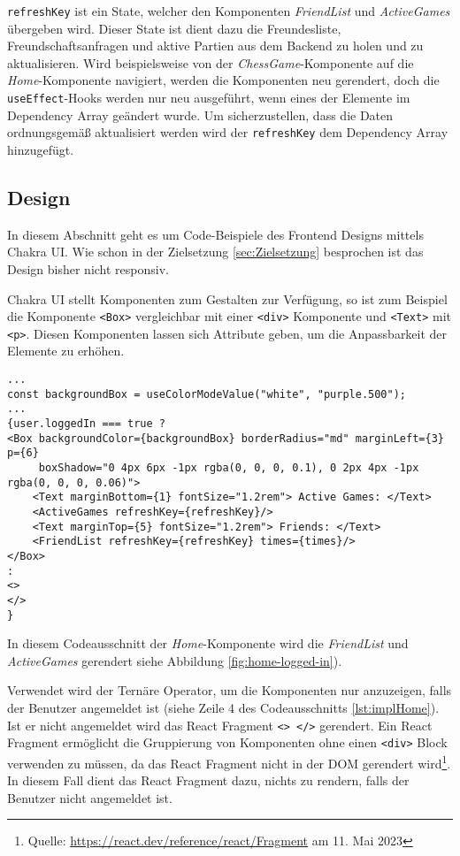 \verb|refreshKey| ist ein State, welcher den Komponenten \textit{FriendList} und \textit{ActiveGames} übergeben wird. Dieser State ist dient dazu die Freundesliste, Freundschaftsanfragen und aktive Partien aus dem Backend zu holen und zu aktualisieren. Wird beispielsweise von der \textit{ChessGame}-Komponente auf die \textit{Home}-Komponente navigiert, werden die Komponenten neu gerendert, doch die \verb|useEffect|-Hooks werden nur neu ausgeführt, wenn eines der Elemente im Dependency Array geändert wurde. Um sicherzustellen, dass die Daten ordnungsgemäß aktualisiert werden wird der \verb|refreshKey| dem Dependency Array hinzugefügt.


\subsection{Design}
\label{sec:Design}
In diesem Abschnitt geht es um Code-Beispiele des Frontend Designs mittels Chakra UI.  Wie schon in der Zielsetzung \ref{sec:Zielsetzung} besprochen ist das Design bisher nicht responsiv.

Chakra UI stellt Komponenten zum Gestalten zur Verfügung, so ist zum Beispiel die Komponente \verb|<Box>| vergleichbar mit einer \verb|<div>| Komponente und \verb|<Text>| mit \verb|<p>|. Diesen Komponenten lassen sich Attribute geben, um die Anpassbarkeit der Elemente zu erhöhen.

\begin{lstlisting}[style=codeStyle, caption={Darstellung der \textit{Friendlist} und \textit{ActiveGames} Komponenten in der \textit{Home}-Komponente}, label={lst:impl-Home}]
...
const backgroundBox = useColorModeValue("white", "purple.500");
...
{user.loggedIn === true ?
<Box backgroundColor={backgroundBox} borderRadius="md" marginLeft={3} p={6}
     boxShadow="0 4px 6px -1px rgba(0, 0, 0, 0.1), 0 2px 4px -1px rgba(0, 0, 0, 0.06)">
    <Text marginBottom={1} fontSize="1.2rem"> Active Games: </Text>
    <ActiveGames refreshKey={refreshKey}/>
    <Text marginTop={5} fontSize="1.2rem"> Friends: </Text>
    <FriendList refreshKey={refreshKey} times={times}/>
</Box>
:
<>
</>
}
\end{lstlisting}

In diesem Codeausschnitt der \textit{Home}-Komponente wird die \textit{FriendList} und \textit{ActiveGames} gerendert siehe Abbildung \ref{fig:home-logged-in}).

Verwendet wird der Ternäre Operator, um die Komponenten nur anzuzeigen, falls der Benutzer angemeldet ist (siehe Zeile 4 des Codeausschnitts \ref{lst:implHome}). Ist er nicht angemeldet wird das React Fragment \verb|<> </>| gerendert. Ein React Fragment ermöglicht die Gruppierung von Komponenten ohne einen \verb|<div>| Block verwenden zu müssen, da das React Fragment nicht in der DOM gerendert wird\footnote{Quelle: \url{https://react.dev/reference/react/Fragment} am 11. Mai 2023}.  In diesem Fall dient das React Fragment dazu, nichts zu rendern, falls der Benutzer nicht angemeldet ist.

